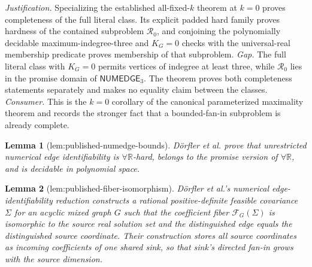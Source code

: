 \documentclass{article}
\newtheorem{lemma}{Lemma}
\begin{document}
\par\smallskip\noindent \textit{Justification.} Specializing the established all-fixed-\(k\) theorem at \(k=0\) proves completeness of the full literal class. Its explicit padded hard family proves hardness of the contained subproblem \(\mathcal R_0\), and conjoining the polynomially decidable maximum-indegree-three and \(K_G=0\) checks with the universal-real membership predicate proves membership of that subproblem. \textit{Gap.} The full literal class with \(K_G=0\) permits vertices of indegree at least three, while \(\mathcal R_0\) lies in the promise domain of \(\mathsf{NUMEDGE}_3\). The theorem proves both completeness statements separately and makes no equality claim between the classes. \textit{Consumer.} This is the \(k=0\) corollary of the canonical parameterized maximality theorem and records the stronger fact that a bounded-fan-in subproblem is already complete.

\begin{lemma}[lem:published-numedge-bounds]\label{lem:published-numedge-bounds}
Dörfler et al. prove that unrestricted numerical edge identifiability is \(\forall\mathbb R\)-hard, belongs to the promise version of \(\forall\mathbb R\), and is decidable in polynomial space.
\end{lemma}

\begin{lemma}[lem:published-fiber-isomorphism]\label{lem:published-fiber-isomorphism}
Dörfler et al.'s numerical edge-identifiability reduction constructs a rational positive-definite feasible covariance \(\Sigma\) for an acyclic mixed graph \(G\) such that the coefficient fiber \(\mathcal F_G(\Sigma)\) is isomorphic to the source real solution set and the distinguished edge equals the distinguished source coordinate.  Their construction stores all source coordinates as incoming coefficients of one shared sink, so that sink's directed fan-in grows with the source dimension.
\end{lemma}
\end{document}
